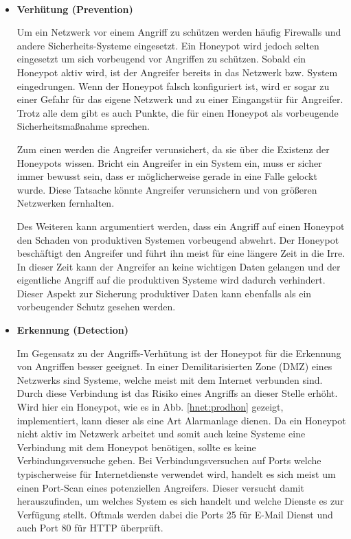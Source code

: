 \\
\begin{itemize}							%
\item{\textbf{Verhütung (Prevention)}} 

Um ein Netzwerk vor einem Angriff zu schützen werden häufig Firewalls und andere Sicherheits-Systeme eingesetzt. Ein Honeypot wird jedoch selten eingesetzt um sich vorbeugend vor Angriffen zu schützen. Sobald ein Honeypot aktiv wird, ist der Angreifer bereits in das Netzwerk bzw. System eingedrungen. Wenn der Honeypot falsch konfiguriert ist, wird er sogar zu einer Gefahr für das eigene Netzwerk und zu einer Eingangstür für Angreifer. Trotz alle dem gibt es auch Punkte, die für einen Honeypot als vorbeugende Sicherheitsmaßnahme sprechen.

Zum einen werden die Angreifer verunsichert, da sie über die Existenz der Honeypots wissen. Bricht ein Angreifer in ein System ein, muss er sicher immer bewusst sein, dass er möglicherweise gerade in eine Falle gelockt wurde. Diese Tatsache könnte Angreifer verunsichern und von größeren Netzwerken fernhalten. 

Des Weiteren kann argumentiert werden, dass ein Angriff auf einen Honeypot den Schaden von produktiven Systemen vorbeugend abwehrt. Der Honeypot beschäftigt den Angreifer und führt ihn meist für eine längere Zeit in die Irre. In dieser Zeit kann der Angreifer an keine wichtigen Daten gelangen und der eigentliche Angriff auf die produktiven Systeme wird dadurch verhindert. Dieser Aspekt zur Sicherung produktiver Daten kann ebenfalls als ein vorbeugender Schutz gesehen werden.   
\item{\textbf{Erkennung (Detection)}}

Im Gegensatz zu der Angriffs-Verhütung ist der Honeypot für die Erkennung von Angriffen besser geeignet. In einer Demilitarisierten Zone (DMZ) eines Netzwerks sind Systeme, welche meist mit dem Internet verbunden sind. Durch diese Verbindung ist das Risiko eines Angriffs an dieser Stelle erhöht. Wird hier ein Honeypot, wie es in Abb. \ref{hnet:prodhon} gezeigt, implementiert, kann dieser als eine Art Alarmanlage dienen. Da ein Honeypot nicht aktiv im Netzwerk arbeitet und somit auch keine Systeme eine Verbindung mit dem Honeypot benötigen, sollte es keine Verbindungsversuche geben.
Bei Verbindungsversuchen auf Ports welche typischerweise für Internetdienste verwendet wird, handelt es sich meist um einen Port-Scan eines potenziellen Angreifers. Dieser versucht damit herauszufinden, um welches System es sich handelt und welche Dienste es zur Verfügung stellt. Oftmals werden dabei die Ports 25 für E-Mail Dienst und auch Port 80 für HTTP überprüft. 


\end{itemize}
